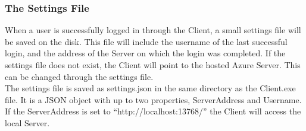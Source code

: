 \subsubsection{The Settings File \label{sec:SettingsFile}}
When a user is successfully logged in through the Client, a small settings file will be saved on the disk. This file will include the username of the last successful login, and the address of the Server on which the login was completed. If the settings file does not exist, the Client will point to the hosted Azure Server. This can be changed through the settings file. \\
The settings file is saved as settings.json in the same directory as the Client.exe file. It is a JSON object with up to two properties, ServerAddress and Username. If the ServerAddress is set to “http://localhost:13768/” the Client will access the local Server.